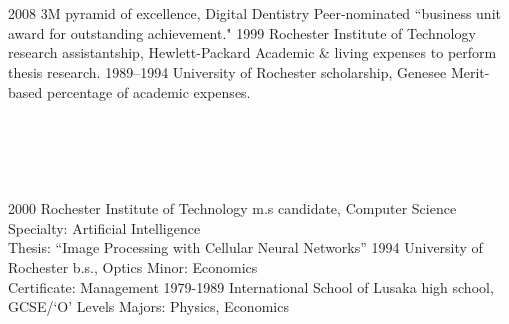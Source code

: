 \documentclass[]{friggeri-cv} %
\begin{document}
\section{{} {} {\normalsize {}}}

\begin{entrylist}
\entry
{2008}
{3M}
{pyramid of excellence, Digital Dentistry}
{Peer-nominated ``business unit award for outstanding achievement."}
\entry
{1999}
{Rochester Institute of Technology}
{research assistantship, Hewlett-Packard}
{Academic \& living expenses to perform thesis research.}
\entry
{1989--1994}
{University of Rochester}
{scholarship, Genesee}
{Merit-based percentage of academic expenses.}
\end{entrylist}



\section{{} {} {\normalsize {} ~~ }}

\begin{entrylist}
\entry
{2000}
{Rochester Institute of Technology}
{m.s candidate, Computer Science}
{Specialty: Artificial Intelligence\\
Thesis: ``Image Processing with Cellular Neural Networks''}
\entry
{1994}
{University of Rochester}
{b.s., Optics}
{Minor: Economics\\
Certificate: Management} 
\entry
{1979-1989}
{International School of Lusaka}
{high school, GCSE/`O' Levels}
{Majors: Physics, Economics}
\end{entrylist}
\end{document}
